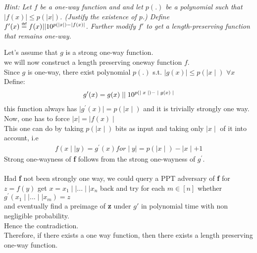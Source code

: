 \documentclass[11pt]{exam}
\newcommand\myeq{\mathrel{\overset{\makebox[0pt]{\mbox{\normalfont\tiny\sffamily def}}}{=}}}
\begin{document}
\begin{questions}
\emph{Hint: Let $f$ be a one-way function and and let $p(.)$ be a polynomial such that $|f(x)|\leq p(|x|)$. (Justify the existence of $p$.) Define $f'(x)\myeq f(x)||10^{p(|x|)-|f(x)|}$. Further modify $f'$ to get a length-preserving function that remains one-way.}
\begin{solution}
    Let's assume that $g$ is a strong one-way function.\\
    we will now construct a length preserving oneway function $f$.\\
    Since $g$ is one-way, there exist polynomial ${p(.)}$ s.t. $\mid g(x)\mid \leq p(\mid x \mid)$ $\forall x$\\
    Define:\\
    \begin{align*}
    g'(x) = g(x)\mid \mid 10\textsuperscript{$p(\mid x \mid)-\mid g(x) \mid$}
    \end{align*}
    this function always has $\mid g^{'}(x)\mid= p(\mid x\mid)$ and it is trivially strongly one way.\\
    Now, one has to force $\mid x \mid = \mid f(x) \mid$\\
    This one can do by taking $p(\mid x\mid)$ bits as input and taking only $\mid x\mid$ of it into account, i.e\\
    \begin{align*}
        f(x\mid\mid y) = g^{'}(x) for \mid y \mid = p(\mid x \mid) - \mid x \mid + 1
    \end{align*}
    Strong one-wayness of \textbf{f} follows from the strong one-wayness of $g^{'}$.\\\\
    Had \textbf{f} not been strongly one way, we could query a PPT adversary of \textbf{f} for $z = f(y)$ get $x = x_1 \mid\mid . . . \mid\mid x_n$ back and try for each $m \in [n]$ whether $g^{'}(x_1\mid\mid . . . \mid\mid x_m) = z$ \\
    and eventually find a preimage of \textbf{z} under $g'$ in polynomial time with non negligible probability.\\
    Hence the contradiction.\\
    Therefore, if there exists a one way function, then there exists a length preserving one-way function.\\
    
\end{solution}

\end{questions}
\end{document}
